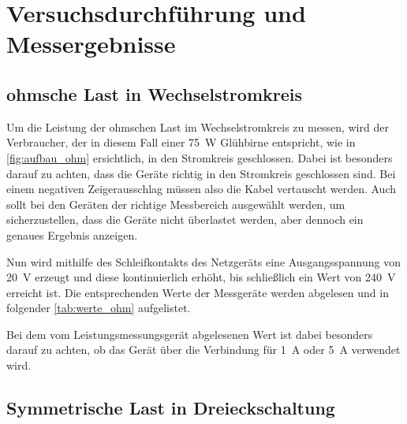 \documentclass[12pt,english,ngerman]{scrartcl}
\begin{document}
\section{Versuchsdurchführung und Messergebnisse}\label{sec:versuchsdurchfuehrung_messergebnisse}

\subsection{ohmsche Last in Wechselstromkreis}

Um die Leistung der ohmschen Last im Wechselstromkreis zu messen, wird der
Verbraucher, der in diesem Fall einer \SI[]{75}{\watt} Glühbirne entspricht,
wie in \autoref{fig:aufbau_ohm} ersichtlich, in den Stromkreis geschlossen.
Dabei ist besonders darauf zu achten, dass die Geräte richtig in den Stromkreis
geschlossen sind. Bei einem negativen Zeigerausschlag müssen also die Kabel
vertauscht werden. Auch sollt bei den Geräten der richtige Messbereich
ausgewählt werden, um sicherzustellen, dass die Geräte nicht überlastet werden,
aber dennoch ein genaues Ergebnis anzeigen.

Nun wird mithilfe des Schleifkontakts des Netzgeräts eine Ausgangsspannung von
\SI[]{20}{\volt} erzeugt und diese kontinuierlich erhöht, bis schließlich ein
Wert von \SI[]{240}{\volt} erreicht ist.
Die entsprechenden Werte der Messgeräte werden abgelesen und in folgender
\autoref{tab:werte_ohm} aufgelistet.

Bei dem vom Leistungsmessungsgerät abgelesenen Wert ist dabei besonders darauf zu achten, ob das Gerät über die 
Verbindung für \SI{1}{\ampere} oder \SI{5}{\ampere} verwendet wird.

\begin{table}[H]
	\caption[Gemessene Werte bei der Variation der ohmschen Last]{Gemessene Werte bei der
		Variation der ohmschen Last       \\
		$U \dots$ gemessene Spannung in V \\
		$I \dots$ gemessener Strom in A   \\
		$P \dots$ gemessene Leistung in W
	}\label{tab:werte_ohm}
	\centering
	
\end{table}

\subsection{Symmetrische Last in Dreieckschaltung}
\end{document}
